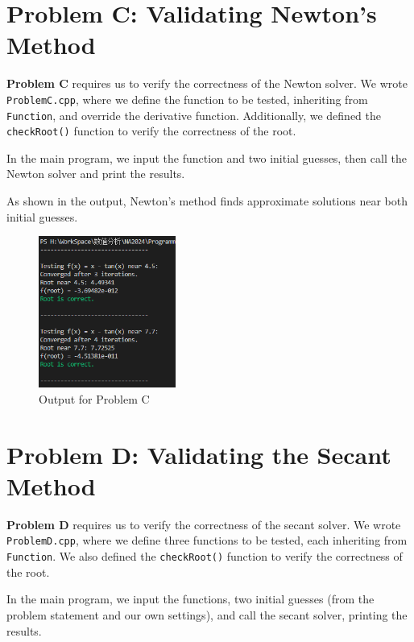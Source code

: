 \documentclass[a4paper]{article}
\begin{document}
\section{Problem C: Validating Newton's Method}

\textbf{Problem C} requires us to verify the correctness of the Newton solver. We wrote \texttt{ProblemC.cpp}, where we define the function to be tested, inheriting from \texttt{Function}, and override the derivative function. Additionally, we defined the \texttt{checkRoot()} function to verify the correctness of the root.

In the main program, we input the function and two initial guesses, then call the Newton solver and print the results. 

As shown in the output, Newton's method finds approximate solutions near both initial guesses.

\begin{figure}[H]  
  \centering
  \includegraphics[width=0.4\textwidth]{./picture/ProblemC.png}
  \caption{Output for Problem C}
\end{figure}

\section{Problem D: Validating the Secant Method}

\textbf{Problem D} requires us to verify the correctness of the secant solver. We wrote \texttt{ProblemD.cpp}, where we define three functions to be tested, each inheriting from \texttt{Function}. We also defined the \texttt{checkRoot()} function to verify the correctness of the root.

In the main program, we input the functions, two initial guesses (from the problem statement and our own settings), and call the secant solver, printing the results.
\end{document}
